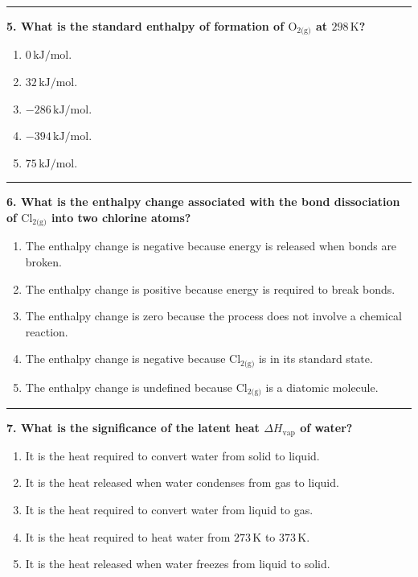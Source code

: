 \documentclass[
  9pt,
]{extbook}
\providecommand{\tightlist}{%
  \setlength{\itemsep}{0pt}\setlength{\parskip}{0pt}}
\theoremstyle{definition}
\theoremstyle{definition}
\theoremstyle{definition}
\theoremstyle{definition}
\theoremstyle{remark}
\begin{document}
\begin{center}\rule{0.5\linewidth}{0.5pt}\end{center}

\textbf{5. What is the standard enthalpy of formation of \(\text{O}_{2\text{(g)}}\) at \(298\,\text{K}\)?}

\begin{enumerate}
\def\labelenumi{\alph{enumi}.}
\tightlist
\item
  \(0\,\text{kJ/mol}\).
\item
  \(32\,\text{kJ/mol}\).
\item
  \(-286\,\text{kJ/mol}\).
\item
  \(-394\,\text{kJ/mol}\).
\item
  \(75\,\text{kJ/mol}\).
\end{enumerate}

\begin{center}\rule{0.5\linewidth}{0.5pt}\end{center}

\textbf{6. What is the enthalpy change associated with the bond dissociation of \(\text{Cl}_{2\text{(g)}}\) into two chlorine atoms?}

\begin{enumerate}
\def\labelenumi{\alph{enumi}.}
\tightlist
\item
  The enthalpy change is negative because energy is released when bonds are broken.
\item
  The enthalpy change is positive because energy is required to break bonds.
\item
  The enthalpy change is zero because the process does not involve a chemical reaction.
\item
  The enthalpy change is negative because \(\text{Cl}_{2\text{(g)}}\) is in its standard state.
\item
  The enthalpy change is undefined because \(\text{Cl}_{2\text{(g)}}\) is a diatomic molecule.
\end{enumerate}

\begin{center}\rule{0.5\linewidth}{0.5pt}\end{center}

\textbf{7. What is the significance of the latent heat \(\Delta H_{\text{vap}}\) of water?}

\begin{enumerate}
\def\labelenumi{\alph{enumi}.}
\tightlist
\item
  It is the heat required to convert water from solid to liquid.
\item
  It is the heat released when water condenses from gas to liquid.
\item
  It is the heat required to convert water from liquid to gas.
\item
  It is the heat required to heat water from \(273\,\text{K}\) to \(373 \,\text{K}\).
\item
  It is the heat released when water freezes from liquid to solid.
\end{enumerate}
\end{document}
